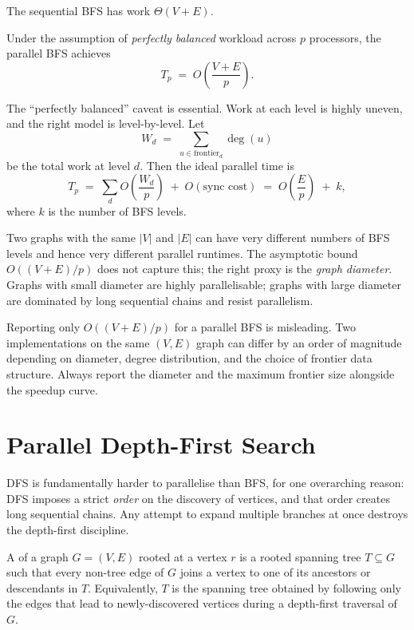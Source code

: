 The sequential BFS has work $\Theta(V + E)$.

\begin{ppdefn}
Under the assumption of \emph{perfectly balanced} workload across $p$
processors, the parallel BFS achieves
\[
  T_p \;=\; O\!\left(\frac{V + E}{p}\right).
\]
\end{ppdefn}

The ``perfectly balanced'' caveat is essential.  Work at each level is
highly uneven, and the right model is level-by-level.  Let
\[
  W_d \;=\; \sum_{u \in \mathrm{frontier}_d} \deg(u)
\]
be the total work at level $d$.  Then the ideal parallel time is
\[
  T_p \;=\; \sum_{d} O\!\left(\frac{W_d}{p}\right) \;+\;
            O(\text{sync cost})
        \;=\; O\!\left(\frac{E}{p}\right) \;+\; k,
\]
where $k$ is the number of BFS levels.

\begin{ppkey}
Two graphs with the same $|V|$ and $|E|$ can have very different
numbers of BFS levels and hence very different parallel runtimes.  The
asymptotic bound $O((V+E)/p)$ does not capture this; the right proxy
is the \emph{graph diameter}.  Graphs with small diameter are highly
parallelisable; graphs with large diameter are dominated by long
sequential chains and resist parallelism.
\end{ppkey}

\begin{pppitfall}
Reporting only $O((V+E)/p)$ for a parallel BFS is misleading.  Two
implementations on the same $(V, E)$ graph can differ by an order of
magnitude depending on diameter, degree distribution, and the choice
of frontier data structure.  Always report the diameter and the
maximum frontier size alongside the speedup curve.
\end{pppitfall}


\section{Parallel Depth-First Search}

DFS is fundamentally harder to parallelise than BFS, for one
overarching reason: DFS imposes a strict \emph{order} on the discovery
of vertices, and that order creates long sequential chains.  Any
attempt to expand multiple branches at once destroys the depth-first
discipline.

\begin{ppdefn}
A  of a graph $G = (V, E)$ rooted at a vertex $r$ is
a rooted spanning tree $T \subseteq G$ such that every non-tree edge
of $G$ joins a vertex to one of its ancestors or descendants in $T$.
Equivalently, $T$ is the spanning tree obtained by following only the
edges that lead to newly-discovered vertices during a depth-first
traversal of $G$.
\end{ppdefn}

